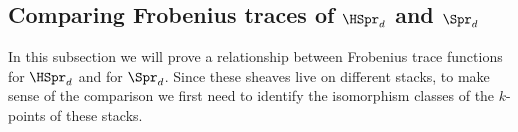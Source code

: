 %



\subsection{Comparing Frobenius traces of $\HSpr_{d}$ and $\Spr_{d}$}\label{ss:trace comp Spr}
In this subsection we will prove a relationship between Frobenius trace functions for $\HSpr_{d}$ and for $\Spr_{d}$. Since these sheaves live on different stacks, to make sense of the comparison we first need to identify the isomorphism classes of the $k$-points of these stacks.

